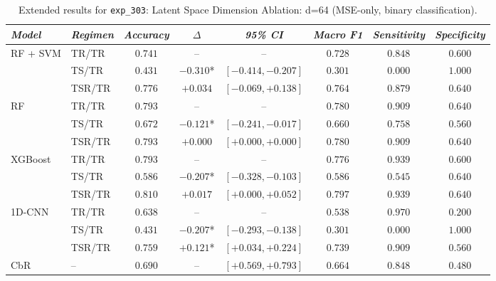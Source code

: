 \begin{table}[H]
\centering
\scriptsize
\caption{Extended results for \texttt{exp\_303}: Latent Space Dimension Ablation: d=64 (MSE-only, binary classification).}
\label{tab:appendix_exp_303}
\begin{tabular*}{\textwidth}{@{\extracolsep{\fill}}llcccccc}
\toprule
\emph{Model} & \emph{Regimen} & \emph{Accuracy} & \emph{$\Delta$} & \emph{95\% CI} & \emph{Macro F1} & \emph{Sensitivity} & \emph{Specificity}\\
\midrule
\multirow{3}{*}{RF + SVM} & TR/TR & $0.741$ & -- & -- & $0.728$ & $0.848$ & $0.600$\\
 & TS/TR & $0.431$ & $-0.310$* & $[-0.414, -0.207]$ & $0.301$ & $0.000$ & $1.000$\\
 & TSR/TR & $0.776$ & $+0.034$ & $[-0.069, +0.138]$ & $0.764$ & $0.879$ & $0.640$\\
\midrule
\multirow{3}{*}{RF} & TR/TR & $0.793$ & -- & -- & $0.780$ & $0.909$ & $0.640$\\
 & TS/TR & $0.672$ & $-0.121$* & $[-0.241, -0.017]$ & $0.660$ & $0.758$ & $0.560$\\
 & TSR/TR & $0.793$ & $+0.000$ & $[+0.000, +0.000]$ & $0.780$ & $0.909$ & $0.640$\\
\midrule
\multirow{3}{*}{XGBoost} & TR/TR & $0.793$ & -- & -- & $0.776$ & $0.939$ & $0.600$\\
 & TS/TR & $0.586$ & $-0.207$* & $[-0.328, -0.103]$ & $0.586$ & $0.545$ & $0.640$\\
 & TSR/TR & $0.810$ & $+0.017$ & $[+0.000, +0.052]$ & $0.797$ & $0.939$ & $0.640$\\
\midrule
\multirow{3}{*}{1D-CNN} & TR/TR & $0.638$ & -- & -- & $0.538$ & $0.970$ & $0.200$\\
 & TS/TR & $0.431$ & $-0.207$* & $[-0.293, -0.138]$ & $0.301$ & $0.000$ & $1.000$\\
 & TSR/TR & $0.759$ & $+0.121$* & $[+0.034, +0.224]$ & $0.739$ & $0.909$ & $0.560$\\
\midrule
CbR & -- & $0.690$ & -- & $[+0.569, +0.793]$ & $0.664$ & $0.848$ & $0.480$\\
\bottomrule
\end{tabular*}
\end{table}

